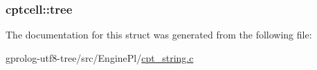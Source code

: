 \subsubsection[{\texorpdfstring{tree}{tree}}]{ cptcell\+::tree}\hypertarget{structcptcell_a8ce1e2723947c6ebce10520f1fcee6be}{}\label{structcptcell_a8ce1e2723947c6ebce10520f1fcee6be}


The documentation for this struct was generated from the following file\+:\begin{DoxyCompactItemize}
\item 
gprolog-\/utf8-\/tree/src/\+Engine\+Pl/\hyperlink{cpt__string_8c}{cpt\+\_\+string.\+c}\end{DoxyCompactItemize}
